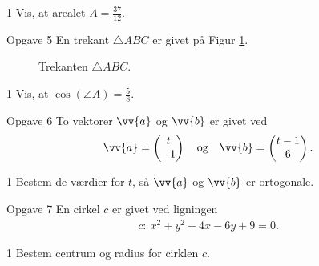 \begin{delopgave}{1}
	Vis, at arealet $A = \frac{37}{12}$.
\end{delopgave}
%
%
%
%
%
\begin{opgavetekst}{Opgave 5}
	En trekant $\triangle ABC$ er givet på Figur \ref{fig:trekant}.
	\begin{figure}[H]
		\centering
		\caption{Trekanten $\triangle ABC$.}
		\label{fig:trekant}
	\end{figure}
	\phantom{h}
\end{opgavetekst}
\begin{delopgave}{1}
	Vis, at $\cos(\angle A) = \frac{5}{8}$.
\end{delopgave}
%
%
%
%
%
\newpage
\begin{opgavetekst}{Opgave 6}
	To vektorer $\vv{a}$ og $\vv{b}$ er givet ved
	\begin{align*}
		\vv{a} = \begin{pmatrix}
			t \\ -1
		\end{pmatrix}
	\quad \textnormal{og} \quad
		\vv{b} = \begin{pmatrix}
			t-1 \\ 6
		\end{pmatrix}.
	\end{align*}
\end{opgavetekst}
\begin{delopgave}{1}
	Bestem de værdier for $t$, så $\vv{a}$ og $\vv{b}$ er ortogonale.
\end{delopgave}
%
%
%
%
\begin{opgavetekst}{Opgave 7}
	En cirkel $c$ er givet ved ligningen
	\begin{align*}
		c:\  x^2 + y^2 - 4x - 6y + 9 = 0.
	\end{align*}
\end{opgavetekst}
\begin{delopgave}{1}
	Bestem centrum og radius for cirklen $c$.
\end{delopgave}	
